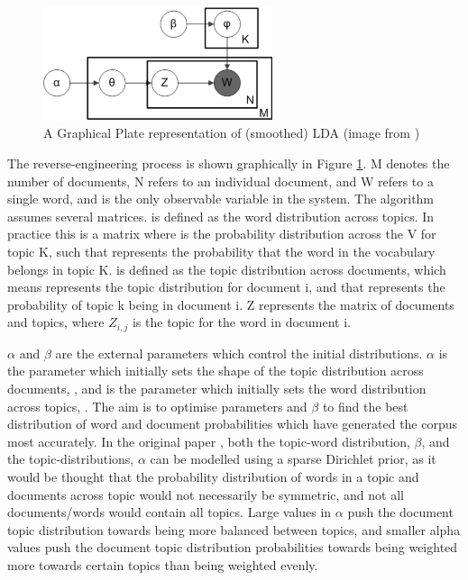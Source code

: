 \begin{figure}[H]
	\centering
	\includegraphics[width=0.6\textwidth]{images/LDA.png}
	\caption{A Graphical Plate representation of (smoothed) LDA (image from \cite{LDA})}
	\label{fig:ldafigure}
\end{figure}

The reverse-engineering process is shown graphically in Figure \ref{fig:ldafigure}. M denotes the number of documents, N refers to an individual document, and W refers to a single word, and is the only observable variable in the system. The algorithm assumes several matrices. \boldmath{$\varphi$} is defined as the word distribution across topics. In practice this is a matrix where  is the probability distribution across the V for topic K, such that  represents the probability that the  word in the vocabulary belongs in topic K. \boldmath{$\theta$} is defined as the topic distribution across documents, which means  represents the topic distribution for document i, and that  represents the probability of topic k being in document i. \textbf{}{Z} represents the matrix of documents and topics, where \textbf{$Z_{i,j}$} is the topic for the  word in document i. 

$\alpha$ and $\beta$ are the external parameters which control the initial distributions. $\alpha$ is the parameter which initially sets the shape of the topic distribution across documents, \boldmath{$\theta$}, and \unboldmath{$\beta$} is the parameter which initially sets the word distribution across topics, \boldmath{$\varphi$}. The aim is to optimise parameters \unboldmath{$\alpha$} and $\beta$ to find the best distribution of word and document probabilities which have generated the corpus most accurately. In the original paper \cite{blei2003latent}, both the topic-word distribution, $\beta$, and the topic-distributions, $\alpha$ can be modelled using a sparse Dirichlet prior, as it would be thought that the probability distribution of words in a topic and documents across topic would not necessarily be symmetric, and not all documents/words would contain all topics. Large values in $\alpha$ push the document topic distribution towards being more balanced between topics, and smaller alpha values push the document topic distribution probabilities towards being weighted more towards certain topics than being weighted evenly. 

